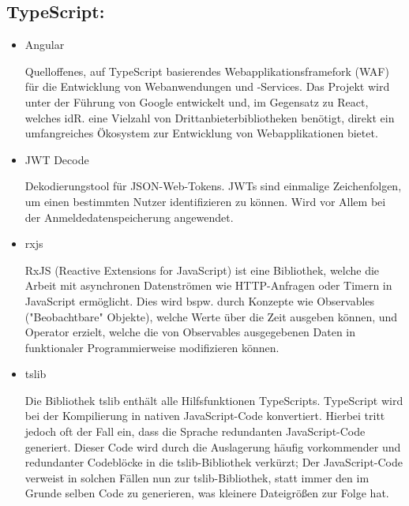 \documentclass{article}
\begin{document}
\subsection{\textbf{TypeScript:}}
\begin{itemize}
    \item Angular
\begin{itemize}
Quelloffenes, auf TypeScript basierendes Webapplikationsframefork (WAF) für die Entwicklung von Webanwendungen und -Services. Das Projekt wird unter der Führung von Google entwickelt und, im Gegensatz zu React, welches idR. eine Vielzahl von Drittanbieterbibliotheken benötigt, direkt ein umfangreiches Ökosystem zur Entwicklung von Webapplikationen bietet.  
\end{itemize}
    \item JWT Decode
\begin{itemize}
Dekodierungstool für JSON-Web-Tokens. JWTs sind einmalige Zeichenfolgen, um einen bestimmten Nutzer identifizieren zu können. Wird vor Allem bei der Anmeldedatenspeicherung angewendet.
\end{itemize}
    \item rxjs
\begin{itemize}
RxJS (Reactive Extensions for JavaScript) ist eine Bibliothek, welche die Arbeit mit asynchronen Datenströmen wie HTTP-Anfragen oder Timern in JavaScript ermöglicht. Dies wird bspw. durch Konzepte wie Observables ("Beobachtbare" Objekte), welche Werte über die Zeit ausgeben können, und Operator erzielt, welche die von Observables ausgegebenen Daten in funktionaler Programmierweise modifizieren können.
\end{itemize}
\item tslib
\begin{itemize}
Die Bibliothek tslib enthält alle Hilfsfunktionen TypeScripts. TypeScript wird bei der Kompilierung in nativen JavaScript-Code konvertiert. Hierbei tritt jedoch oft der Fall ein, dass die Sprache redundanten JavaScript-Code generiert. Dieser Code wird durch die Auslagerung häufig vorkommender und redundanter Codeblöcke in die tslib-Bibliothek verkürzt; Der JavaScript-Code verweist in solchen Fällen nun zur tslib-Bibliothek, statt immer den im Grunde selben Code zu generieren, was kleinere Dateigrößen zur Folge hat.
\end{itemize}





\end{itemize}
\end{document}
